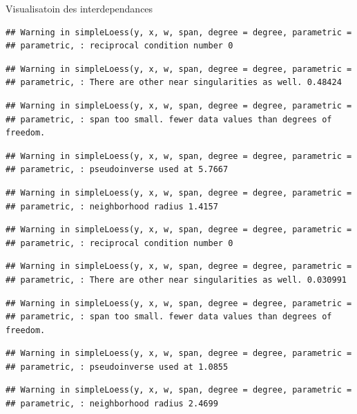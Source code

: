 \documentclass[11pt,ignorenonframetext,]{beamer}
\begin{document}
\begin{frame}[fragile]{Visualisatoin des interdependances}
\begin{verbatim}
## Warning in simpleLoess(y, x, w, span, degree = degree, parametric =
## parametric, : reciprocal condition number 0
\end{verbatim}

\begin{verbatim}
## Warning in simpleLoess(y, x, w, span, degree = degree, parametric =
## parametric, : There are other near singularities as well. 0.48424
\end{verbatim}

\begin{verbatim}
## Warning in simpleLoess(y, x, w, span, degree = degree, parametric =
## parametric, : span too small. fewer data values than degrees of freedom.
\end{verbatim}

\begin{verbatim}
## Warning in simpleLoess(y, x, w, span, degree = degree, parametric =
## parametric, : pseudoinverse used at 5.7667
\end{verbatim}

\begin{verbatim}
## Warning in simpleLoess(y, x, w, span, degree = degree, parametric =
## parametric, : neighborhood radius 1.4157
\end{verbatim}

\begin{verbatim}
## Warning in simpleLoess(y, x, w, span, degree = degree, parametric =
## parametric, : reciprocal condition number 0
\end{verbatim}

\begin{verbatim}
## Warning in simpleLoess(y, x, w, span, degree = degree, parametric =
## parametric, : There are other near singularities as well. 0.030991
\end{verbatim}

\begin{verbatim}
## Warning in simpleLoess(y, x, w, span, degree = degree, parametric =
## parametric, : span too small. fewer data values than degrees of freedom.
\end{verbatim}

\begin{verbatim}
## Warning in simpleLoess(y, x, w, span, degree = degree, parametric =
## parametric, : pseudoinverse used at 1.0855
\end{verbatim}

\begin{verbatim}
## Warning in simpleLoess(y, x, w, span, degree = degree, parametric =
## parametric, : neighborhood radius 2.4699
\end{verbatim}


\end{frame}
\end{document}
